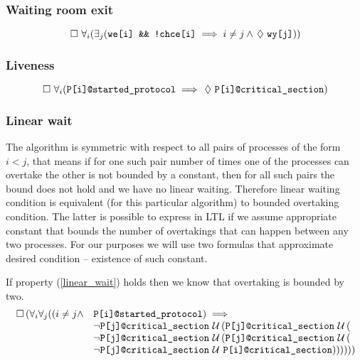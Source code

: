 \subsubsection*{Waiting room exit}

\begin{equation}
\always \forall_i (\exists_j (\verb+we[i] && !chce[i]+ \implies i \neq j \land \eventually \verb+wy[j]+)) \label{anteroom_exit}
\end{equation}

\subsubsection*{Liveness}

\begin{equation}
\always \forall_i (\verb+P[i]@started_protocol+ \implies \eventually \verb+P[i]@critical_section+) \label{liveness}
\end{equation}

\subsubsection*{Linear wait}

The algorithm is symmetric with respect to all pairs of processes of the form $i < j$, that means if for one such pair number of times one of the processes can overtake the other is not bounded by a constant, then for all such pairs the bound does not hold and we have no linear waiting.
Therefore linear waiting condition is equivalent (for this particular algorithm) to bounded overtaking condition.
The latter is possible to express in LTL if we assume appropriate constant that bounds the number of overtakings that can happen between any two processes.
For our purposes we will use two formulas that approximate desired condition -- existence of such constant.

If property (\ref{linear_wait}) holds then we know that overtaking is bounded by two.
\begin{equation}
\begin{array}{rl}
\always (\forall_i \forall_j ((i \neq j \land & \verb+P[i]@started_protocol+) \implies \\
 & \neg \verb+P[j]@critical_section+ \until (\verb+P[j]@critical_section+ \until ( \\
 & \neg \verb+P[j]@critical_section+ \until (\verb+P[j]@critical_section+ \until ( \\
 & \neg \verb+P[j]@critical_section+ \until \verb+P[i]@critical_section+))))))
\end{array}
\label{linear_wait}
\end{equation}

